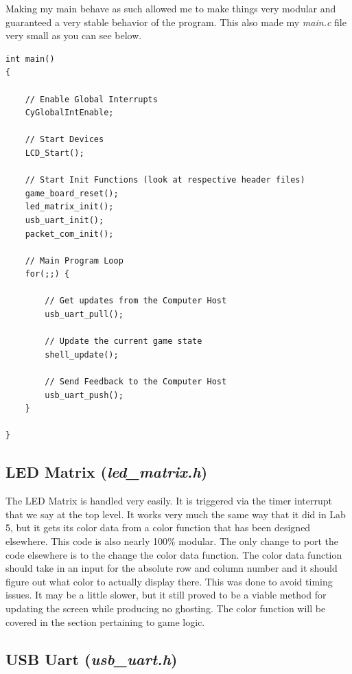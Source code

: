\documentclass[a4paper, 12pt]{article}
\begin{document}
    Making my main behave as such allowed me to make things very modular and
    guaranteed a very stable behavior of the program. This also made my
    \textit{main.c} file very small as you can see below.

    \begin{verbatim}
int main()
{
    
    // Enable Global Interrupts
    CyGlobalIntEnable;
    
    // Start Devices
    LCD_Start();
    
    // Start Init Functions (look at respective header files)
    game_board_reset();
    led_matrix_init();
    usb_uart_init();
    packet_com_init();
    
    // Main Program Loop
    for(;;) {
        
        // Get updates from the Computer Host
        usb_uart_pull();
        
        // Update the current game state
        shell_update();
        
        // Send Feedback to the Computer Host
        usb_uart_push();
    }
    
}
    \end{verbatim}

    \subsection{LED Matrix (\textit{led\_matrix.h})}

    The LED Matrix is handled very easily. It is triggered via the timer
    interrupt that we say at the top level. It works very much the same way
    that it did in Lab 5, but it gets its color data from a color function
    that has been designed elsewhere. This code is also nearly 100\% modular.
    The only change to port the code elsewhere is to the change the color
    data function. The color data function should take in an input for the
    absolute row and column number and it should figure out what color to
    actually display there. This was done to avoid timing issues. It may be
    a little slower, but it still proved to be a viable method for updating
    the screen while producing no ghosting. The color function will be
    covered in the section pertaining to game logic.

    \subsection{USB Uart (\textit{usb\_uart.h})}
\end{document}
